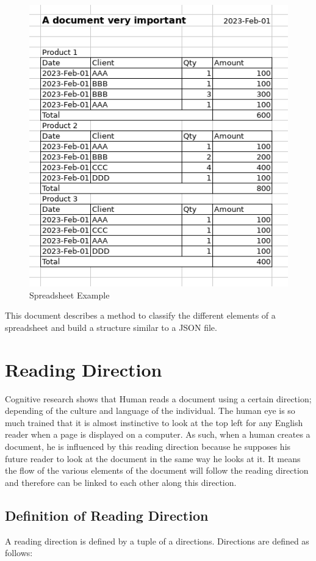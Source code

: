 \documentclass{article}
\begin{document}
\begin{figure}[H]
\caption{Spreadsheet Example}
\includegraphics[width=\columnwidth]{spreadsheet_example}
\end{figure}

This document describes a method to classify the different elements of a spreadsheet and build a structure  similar to a JSON file.

\section{Reading Direction}
Cognitive research shows that Human reads a document using a certain direction; depending of the culture and language of
the individual. The human eye is so much trained that it is almost instinctive to look at the top left for any English
reader when a page is displayed on a computer. As such, when a human creates a document, he is influenced by this
reading direction because he supposes his future reader to look at the document in the same way he looks at it. It means
the flow of the various elements of the document will follow the reading direction and therefore can be linked to each
other along this direction.

\subsection{Definition of Reading Direction}
A reading direction is defined by a tuple of a directions. Directions are defined as follows:
\end{document}
